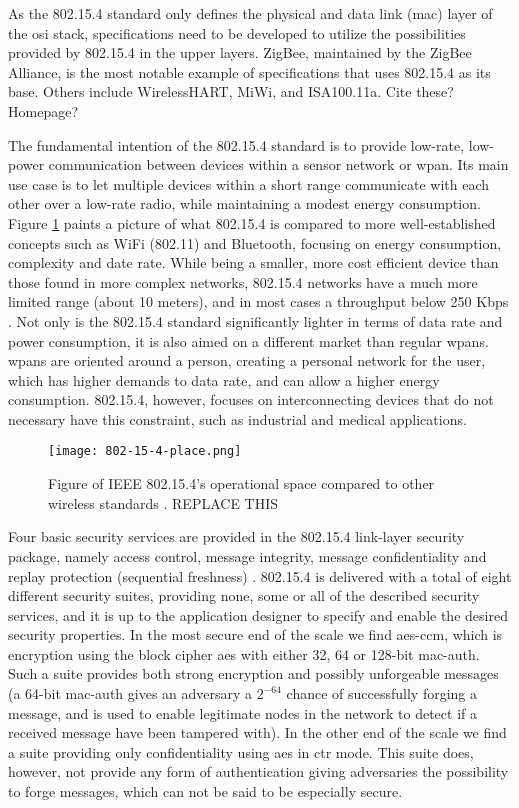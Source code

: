 As the 802.15.4 standard only defines the physical and data link (\gls{mac}) layer of the \gls{osi} stack, specifications need to be developed to utilize the possibilities provided by 802.15.4 in the upper layers. ZigBee, maintained by the ZigBee Alliance, is the most notable example of specifications that uses 802.15.4 as its base. Others include WirelessHART, MiWi, and ISA100.11a. Cite these? Homepage?


The fundamental intention of the 802.15.4 standard is to provide low-rate, low-power communication between devices within a sensor network or \gls{wpan}. Its main use case is to let multiple devices within a short range communicate with each other over a low-rate radio, while maintaining a modest energy consumption. Figure \ref{fig:802154-figure} paints a picture of what 802.15.4 is compared to more well-established concepts such as WiFi (802.11) and Bluetooth, focusing on energy consumption, complexity and date rate. While being a smaller, more cost efficient device than those found in more complex networks, 802.15.4 networks have a much more limited range (about 10 meters), and in most cases a throughput below 250 Kbps \cite{gutierrez2001ieee}. Not only is the 802.15.4 standard significantly lighter in terms of data rate and power consumption, it is also aimed on a different market than regular \gls{wpan}s. \gls{wpan}s are oriented around a person, creating a personal network for the user, which has higher demands to data rate, and can allow a higher energy consumption. 802.15.4, however, focuses on interconnecting devices that do not necessary have this constraint, such as industrial and medical applications. 

\begin{figure}
	\centering
	\texttt{[image: 802-15-4-place.png]}
	\caption{Figure of IEEE 802.15.4's operational space compared to other wireless standards \cite{gutierrez2001ieee}. REPLACE THIS}
	\label{fig:802154-figure}
\end{figure}

Four basic security services are provided in the 802.15.4 link-layer security package, namely access control, message integrity, message confidentiality and replay protection (sequential freshness) \cite{sastry2004security}. 802.15.4 is delivered with a total of eight different security suites, providing none, some or all of the described security services, and it is up to the application designer to specify and enable the desired security properties. In the most secure end of the scale we find \gls{aes}-\gls{ccm}, which is encryption using the block cipher \gls{aes} with either 32, 64 or 128-bit \gls{mac-auth}. Such a suite provides both strong encryption and possibly unforgeable messages (a 64-bit \gls{mac-auth} gives an adversary a $2^{-64}$ chance of successfully forging a message, and is used to enable legitimate nodes in the network to detect if a received message have been tampered with). In the other end of the scale we find a suite providing only confidentiality using \gls{aes} in \gls{ctr} mode. This suite does, however, not provide any form of authentication giving adversaries the possibility to forge messages, which can not be said to be especially secure.

